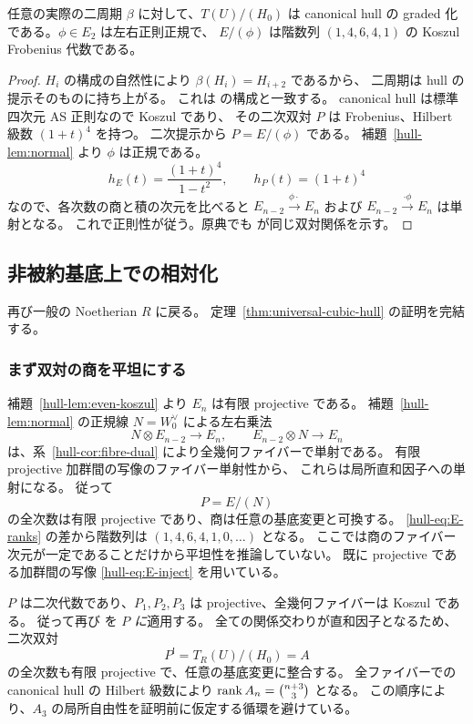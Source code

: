 \begin{corollary}[体上の双対と正則性]
\label{hull-cor:fibre-dual}
任意の実際の二周期 $\beta$ に対して、$T(U)/(H_0)$ は canonical hull の
graded 化である。$\phi\in E_2$ は左右正則正規で、
$E/(\phi)$ は階数列 $(1,4,6,4,1)$ の Koszul Frobenius 代数である。
\end{corollary}
\begin{proof}
$H_i$ の構成の自然性により $\beta(H_i)=H_{i+2}$ であるから、
二周期は hull の提示そのものに持ち上がる。
これは \cite[Lemmas 6.4--6.5, Proposition 6.6]{VdB2011} の構成と一致する。
canonical hull は標準四次元 AS 正則なので Koszul であり、
その二次双対 $P$ は Frobenius、Hilbert 級数 $(1+t)^4$ を持つ。
二次提示から $P=E/(\phi)$ である。
補題~\ref{hull-lem:normal} より $\phi$ は正規である。
\[
 h_E(t)=\frac{(1+t)^4}{1-t^2},\qquad h_P(t)=(1+t)^4
\]
なので、各次数の商と積の次元を比べると
$E_{n-2}\xrightarrow{\phi\cdot}E_n$ および
$E_{n-2}\xrightarrow{\cdot\phi}E_n$ は単射となる。
これで正則性が従う。原典でも \cite[Propositions 2.7, 3.2]{BauwensVanDenBergh1998} が同じ双対関係を示す。
\end{proof}

\subsection{非被約基底上での相対化}

再び一般の Noetherian $R$ に戻る。
定理~\ref{thm:universal-cubic-hull} の証明を完結する。

\subsubsection{まず双対の商を平坦にする}

補題~\ref{hull-lem:even-koszul} より $E_n$ は有限 projective である。
補題~\ref{hull-lem:normal} の正規線 $N=W_0^{\vee}$ による左右乗法
\[
 N\otimes E_{n-2}\longrightarrow E_n,
 \qquad E_{n-2}\otimes N\longrightarrow E_n
 \tag{UH-16}\label{hull-eq:E-inject}
\]
は、系~\ref{hull-cor:fibre-dual} により全幾何ファイバーで単射である。
有限 projective 加群間の写像のファイバー単射性から、
これらは局所直和因子への単射になる。
従って
\[
 P=E/(N)
 \tag{UH-17}\label{hull-eq:P}
\]
の全次数は有限 projective であり、商は任意の基底変更と可換する。
\eqref{hull-eq:E-ranks} の差から階数列は $(1,4,6,4,1,0,\ldots)$ となる。
ここでは商のファイバー次元が一定であることだけから平坦性を推論していない。
既に projective である加群間の写像 \eqref{hull-eq:E-inject} を用いている。

$P$ は二次代数であり、$P_1,P_2,P_3$ は projective、全幾何ファイバーは Koszul である。
従って再び \cite[Chapter 6, Theorem 7.3]{PolishchukPositselski2005} を \emph{$P$ に}適用する。
全ての関係交わりが直和因子となるため、二次双対
\[
 P^!=T_R(U)/(H_0)=A
\]
の全次数も有限 projective で、任意の基底変更に整合する。
全ファイバーでの canonical hull の Hilbert 級数により
$\operatorname{rank} A_n=\binom{n+3}{3}$ となる。
この順序により、$A_3$ の局所自由性を証明前に仮定する循環を避けている。

